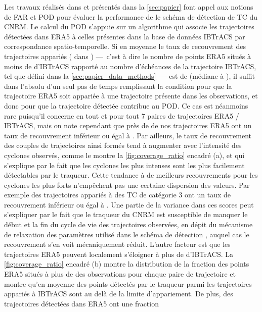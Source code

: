 \documentclass[../main.tex]{subfiles}
\begin{document}
Les travaux réalisés dans \textcite{dulac_assessing_2023} et présentés dans la \cref{sec:papier} font appel aux notions de FAR et POD pour évaluer la performance de
le schéma de détection de TC du CNRM. Le calcul du POD s'appuie sur un algorithme qui associe les trajectoires détectées dans ERA5 à celles présentes dans la
base de données IBTrACS par correspondance spatio-temporelle. Si en moyenne le taux de recouvrement des trajectoires appariés ( dans
\textcite{dulac_assessing_2023}) ---~c'est à dire le nombre de points ERA5 situés à moins de  d'IBTrACS rapporté au nombre d'échéances de la trajectoire
IBTrACS, tel que défini dans la \cref{sec:papier_data_methods}~--- est de  (médiane à ), il suffit dans l'absolu d'un seul pas de temps
remplissant la condition pour que la trajectoire ERA5 soit appariée à une trajectoire présente dans les observations, et donc pour que la trajectoire détectée
contribue au POD. Ce cas est néanmoins rare puisqu'il concerne en tout et pour tout \num{7} paires de trajectoires ERA5 / IBTrACS, mais on note cependant que
près de  de nos trajectoires ERA5 ont un taux de recouvrement inférieur ou égal à . Par ailleurs, le taux de recouvrement des couples de
trajectoires ainsi formés tend à augmenter avec l'intensité des cyclones observés, comme le montre la \cref{fig:coverage_ratio} encadré (a), et qui s'explique
par le fait que les cyclones les plus intenses sont les plus facilement détectables par le traqueur. Cette tendance à de meilleurs recouvrements pour les
cyclones les plus forts n'empêchent pas une certaine dispersion des valeurs. Par exemple  des trajectoires appariés à des TC de catégorie \num{3} ont un
taux de recouvrement inférieur ou égal à . Une partie de la variance dans ces scores peut s'expliquer par le fait que le traqueur du CNRM est
susceptible de manquer le début et la fin du cycle de vie des trajectoires observées, en dépit du mécanisme de relaxation des paramètres utilisé dans le schéma
de détection \parencite[][Figure 8]{bourdin_intercomparison_2022}, auquel cas le recouvrement s'en voit mécaniquement réduit. L'autre facteur est que les
trajectoires ERA5 peuvent localement s'éloigner à plus de  d'IBTrACS. La \cref{fig:coverage_ratio} encadré (b) montre la distribution de la fraction des
points ERA5 situés à plus de  des observations pour chaque paire de trajectoire et montre qu'en moyenne  des points détectés par le traqueur
parmi les trajectoires appariés à IBTrACS sont au delà de la limite d'appariement. De plus,  des trajectoires détectées dans ERA5 ont une fraction
\end{document}
